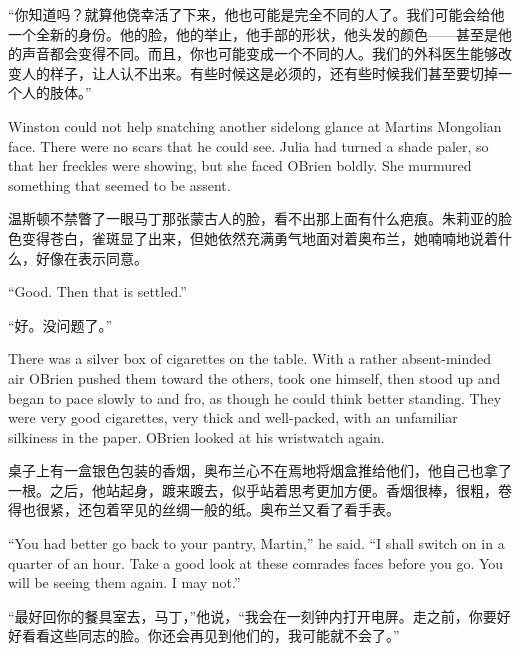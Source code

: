 \begin{paracol}{2}
\switchcolumn

``你知道吗？就算他侥幸活了下来，他也可能是完全不同的人了。我们可能会给他一个全新的身份。他的脸，他的举止，他手部的形状，他头发的颜色——甚至是他的声音都会变得不同。而且，你也可能变成一个不同的人。我们的外科医生能够改变人的样子，让人认不出来。有些时候这是必须的，还有些时候我们甚至要切掉一个人的肢体。''

\switchcolumn*

Winston could not help snatching another sidelong glance at
Martin\textquotesingle s Mongolian face. There were no scars that he
could see. Julia had turned a shade paler, so that her freckles were
showing, but she faced O\textquotesingle Brien boldly. She murmured
something that seemed to be assent.

\switchcolumn

温斯顿不禁瞥了一眼马丁那张蒙古人的脸，看不出那上面有什么疤痕。朱莉亚的脸色变得苍白，雀斑显了出来，但她依然充满勇气地面对着奥布兰，她喃喃地说着什么，好像在表示同意。

\switchcolumn*

``Good. Then that is settled.''

\switchcolumn

``好。没问题了。''

\switchcolumn*

There was a silver box of cigarettes on the table. With a rather
absent-minded air O\textquotesingle Brien pushed them toward the others,
took one himself, then stood up and began to pace slowly to and fro, as
though he could think better standing. They were very good cigarettes,
very thick and well-packed, with an unfamiliar silkiness in the paper.
O\textquotesingle Brien looked at his wristwatch again.

\switchcolumn

桌子上有一盒银色包装的香烟，奥布兰心不在焉地将烟盒推给他们，他自己也拿了一根。之后，他站起身，踱来踱去，似乎站着思考更加方便。香烟很棒，很粗，卷得也很紧，还包着罕见的丝绸一般的纸。奥布兰又看了看手表。

\switchcolumn*

``You had better go back to your pantry, Martin,'' he said. ``I shall
switch on in a quarter of an hour. Take a good look at these
comrades\textquotesingle{} faces before you go. You will be seeing them
again. I may not.''

\switchcolumn

``最好回你的餐具室去，马丁，''他说，``我会在一刻钟内打开电屏。走之前，你要好好看看这些同志的脸。你还会再见到他们的，我可能就不会了。''


\end{paracol}
